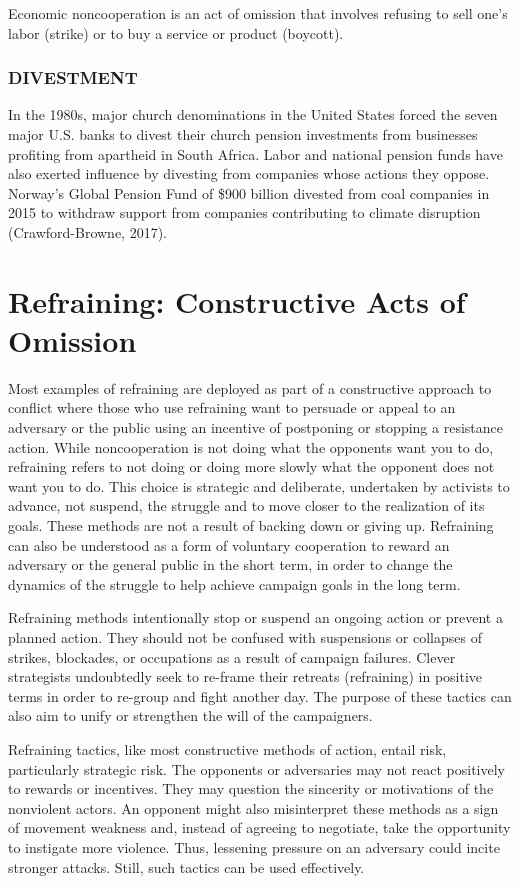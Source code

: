 \documentclass[twoside,a4paper,12pt,fleqn,openany]{extbook}
\begin{document}
Economic noncooperation is an act of omission that involves refusing to sell one’s labor (strike) or to buy a service or product (boycott).

\subsubsection*{DIVESTMENT}

In the 1980s, major church denominations in the United States forced the seven major U.S. banks to divest their church pension investments from businesses profiting from apartheid in South Africa. Labor and national pension funds have also exerted influence by divesting from companies whose actions they oppose. Norway’s Global Pension Fund of \$900 billion divested from coal companies in 2015 to withdraw support from companies contributing to climate disruption (Crawford-Browne, 2017).

\section*{Refraining: Constructive Acts of Omission}

Most examples of refraining are deployed as part of a constructive approach to conflict where those who use refraining want to persuade or appeal to an adversary or the public using an incentive of postponing or stopping a resistance action. While noncooperation is not doing what the opponents want you to do, refraining refers to not doing or doing more slowly what the opponent does not want you to do. This choice is strategic and deliberate, undertaken by activists to advance, not suspend, the struggle and to move closer to the realization of its goals. These methods are not a result of backing down or giving up. Refraining can also be understood as a form of voluntary cooperation to reward an adversary or the general public in the short term, in order to change the dynamics of the struggle to help achieve campaign goals in the long term.

Refraining methods intentionally stop or suspend an ongoing action or prevent a planned action. They should not be confused with suspensions or collapses of strikes, blockades, or occupations as a result of campaign failures. Clever strategists undoubtedly seek to re-frame their retreats (refraining) in positive terms in order to re-group and fight another day. The purpose of these tactics can also aim to unify or strengthen the will of the campaigners.

Refraining tactics, like most constructive methods of action, entail risk, particularly strategic risk. The opponents or adversaries may not react positively to rewards or incentives. They may question the sincerity or motivations of the nonviolent actors. An opponent might also misinterpret these methods as a sign of movement weakness and, instead of agreeing to negotiate, take the opportunity to instigate more violence. Thus, lessening pressure on an adversary could incite stronger attacks. Still, such tactics can be used effectively.
\end{document}
